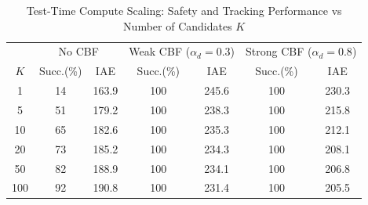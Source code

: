 \begin{table}[htbp]
\centering
\caption{Test-Time Compute Scaling: Safety and Tracking Performance vs Number of Candidates $K$}
\label{tab:k_scaling}
\begin{tabular}{c|cc|cc|cc}
\toprule
 & \multicolumn{2}{c|}{No CBF} & \multicolumn{2}{c|}{Weak CBF ($\alpha_d=0.3$)} & \multicolumn{2}{c}{Strong CBF ($\alpha_d=0.8$)} \\
$K$ & Succ.(\%) & IAE & Succ.(\%) & IAE & Succ.(\%) & IAE \\
\midrule
  1 & 14 & 163.9 & 100 & 245.6 & 100 & 230.3 \\
  5 & 51 & 179.2 & 100 & 238.3 & 100 & 215.8 \\
  10 & 65 & 182.6 & 100 & 235.3 & 100 & 212.1 \\
  20 & 73 & 185.2 & 100 & 234.3 & 100 & 208.1 \\
  50 & 82 & 188.9 & 100 & 234.1 & 100 & 206.8 \\
  100 & 92 & 190.8 & 100 & 231.4 & 100 & 205.5 \\
\bottomrule
\end{tabular}
\end{table}

